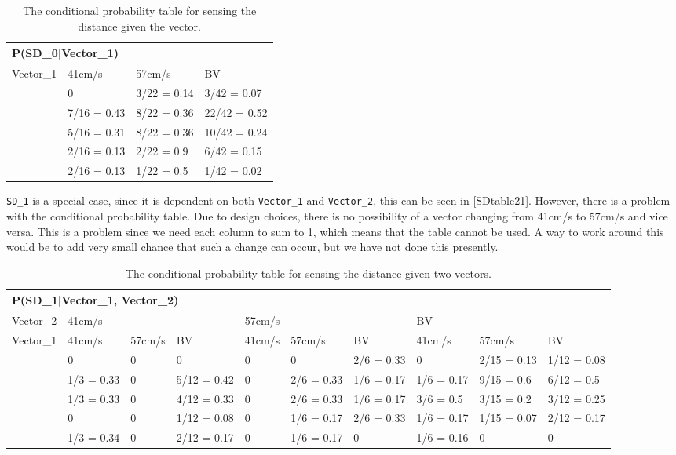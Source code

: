 \begin{table}[H]
\centering
\begin{tabular}{|l|l|l|l|}
\hline
\multicolumn{4}{|l|}{P(SD\_0|Vector\_1)} \\ \hline
Vector\_1     & 41cm/s & 57cm/s & BV \\\hline 
[0 - 60]      & 0       & 3/22 = 0.14 & 3/42 = 0.07\\ \hline 
[60 - 75]    & 7/16 = 0.43 & 8/22 = 0.36 & 22/42 = 0.52\\ \hline
[75 - 90]   & 5/16 = 0.31 & 8/22 = 0.36 & 10/42 = 0.24\\ \hline
[90 - 105]   & 2/16 = 0.13 & 2/22 = 0.9 & 6/42 = 0.15\\ \hline
[105 - 255]   & 2/16 = 0.13& 1/22 = 0.5 & 1/42 = 0.02 \\ \hline
\end{tabular}
\caption{The conditional probability table for sensing the distance given the
vector.}
\label{SDtable1}
\end{table}
  
\texttt{SD\_1} is a special case, since it is dependent on both
\texttt{Vector\_1} and \texttt{Vector\_2}, this can be seen in
\autoref{SDtable21}. However, there is a problem with the conditional
probability table. Due to design choices, there is no possibility of a
vector changing from 41cm/s to 57cm/s and vice versa. This is a problem since we
need each column to sum to 1, which means that the table cannot be
used. A way to work around this would be to add very small chance that such
a change can occur, but we have not done this presently.

\begin{table}[H]
\centering
\begin{tabular}{|l|p{1.2cm}|p{1.2cm}|p{1.2cm}|p{1.2cm}|p{1.2cm}|p{1.2cm}|p{1.2cm}|p{1.2cm}|p{1.2cm}|}
\hline
\multicolumn{10}{|l|}{P(SD\_1|Vector\_1, Vector\_2)} \\\hline
Vector\_2 & \multicolumn{3}{l|}{41cm/s} & \multicolumn{3}{l|}{57cm/s} &
\multicolumn{3}{l|}{BV}\\\hline
Vector\_1 & 41cm/s      &  57cm/s     & BV     & 41cm/s      & 57cm/s     
& BV & 41cm/s & 57cm/s & BV \\\hline
[0-60]& 0 & 0 & 0 & 0 & 0 & 2/6 = 0.33& 0 & 2/15 = 0.13 & 1/12 = 0.08 \\\hline
[60-75]& 1/3 = 0.33 & 0 & 5/12 = 0.42 & 0 & 2/6 = 0.33 & 1/6 = 0.17 & 1/6 = 0.17
& 9/15 = 0.6 & 6/12 = 0.5\\ \hline
[75-90] & 1/3 = 0.33 & 0 & 4/12 = 0.33 & 0 & 2/6 = 0.33 & 1/6 = 0.17 & 3/6 =
0.5 & 3/15 = 0.2 &3/12 = 0.25\\\hline
[90-105] & 0 & 0 & 1/12 = 0.08 & 0 & 1/6 = 0.17 & 2/6 = 0.33 & 1/6 = 0.17
& 1/15 = 0.07 & 2/12 = 0.17\\\hline
[105-255] & 1/3 = 0.34 & 0 & 2/12 = 0.17& 0 & 1/6 = 0.17 & 0 & 1/6 = 0.16 & 0
&0\\\hline
\end{tabular}
\caption{The conditional probability table for sensing the distance given two
vectors.}
\label{SDtable21}
\end{table}

